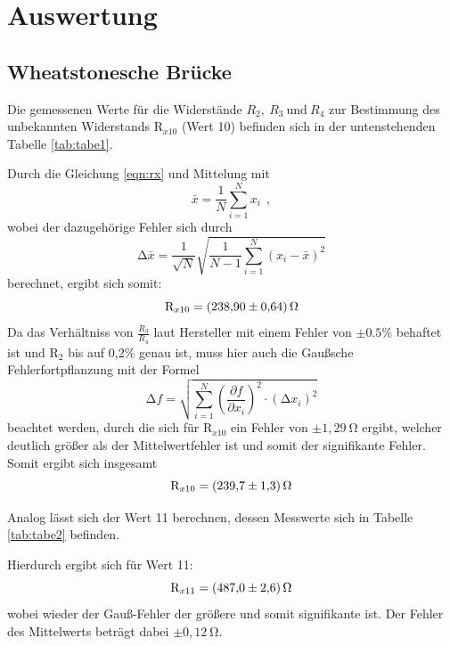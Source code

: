 \section{Auswertung}
\subsection{Wheatstonesche Brücke}
Die gemessenen Werte für die Widerstände $ R_2, \: R_3 \: \text{und} \: R_4 $ zur
Bestimmung des unbekannten Widerstands $\text{R}_{x10} $ (Wert 10) befinden sich in
der untenstehenden Tabelle \ref{tab:tabe1}.

\noindent Durch die Gleichung \ref{eqn:rx}
und Mittelung mit
\begin{equation}
  \bar{x} = \frac{1}{N} \sum_{i=1}^{N} x_i \: \: ,
\end{equation}
\noindent wobei der dazugehörige Fehler sich durch
\begin{equation}
  \increment \bar{x} = \frac{1}{\sqrt{N}} \sqrt{ \frac{1}{N-1} \sum_{i=1}^N
  (x_i - \bar{x})^2}
  \label{eqn:mitf}
\end{equation}
\noindent berechnet, ergibt sich somit:
\begin{equation*}
  \text{R}_{x10} = \SI{238.90 (64)}{\ohm}
\end{equation*}
\noindent Da das Verhältniss von $ \frac{R_3}{R_4} $ laut Hersteller mit einem
Fehler von $ \pm 0.5 \% $  behaftet ist und $ \text{R}_2 $ bis auf
0,2\% genau ist, muss hier auch die Gaußsche
Fehlerfortpflanzung mit der Formel
\begin{equation}
  \increment f = \sqrt{ \sum_{i=1}^N \left( \frac{\partial f}{\partial x_i}\right)^2
  \cdot (\increment x_i)^2  }
  \label{eqn:gaus}
\end{equation}
\noindent beachtet werden, durch die sich für $ \text{R}_{x10} $ ein Fehler von $ \pm 1,29 \: \si{\ohm} $
ergibt, welcher deutlich größer als der Mittelwertfehler ist und somit der signifikante
Fehler. Somit ergibt sich insgesamt
\begin{equation*}
  \text{R}_{x10} = \SI{239.7 (13)}{\ohm}
\end{equation*}


\noindent Analog lässt sich der Wert 11 berechnen, dessen Messwerte sich in Tabelle
\ref{tab:tabe2} befinden.

\noindent Hierdurch ergibt sich für Wert 11:
\begin{equation*}
  \text{R}_{x11} = \SI{487.0 (26)}{\ohm}
\end{equation*}
\noindent wobei wieder der Gauß-Fehler der größere und somit signifikante ist. Der Fehler
des Mittelwerts beträgt dabei $ \pm 0,12 \: \si{\ohm}$.

